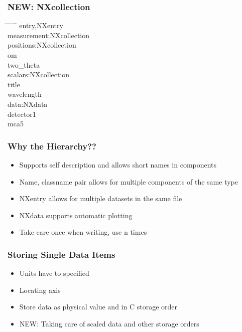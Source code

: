 \documentclass{beamer}
\begin{document}
\begin{frame} \frametitle{{\color{red}NEW: NXcollection}}
\begin{tabbing}
\hspace*{1cm} \= \hspace*{1cm} \= \hspace*{1cm} \= \hspace*{1cm} \= \hspace*{1cm} \= \hspace*{1cm}\= \kill
\>entry,NXentry\\
\> \>measurement:NXcollection\\
\> \> \>positions:NXcollection\\
\> \> \> \>om \\
\> \> \> \>two\_theta\\
\> \> \>scalars:NXcollection\\
\> \> \> \>title\\
\> \> \> \>wavelength\\
\> \> \>data:NXdata\\
\> \> \> \>detector1\\
\> \> \> \>mca5\\
\end{tabbing}
\end{frame}


\begin{frame} \frametitle{Why the Hierarchy??}
\begin{itemize}
\item<1->Supports self description and allows short names in components
\item<2->Name, classname pair allows for multiple components of the same type
\item<3->NXentry allows for multiple datasets in the same file
\item<4->NXdata supports automatic plotting
\item<5->Take care once when writing, use n times
\end{itemize}
\end{frame}


\begin{frame} \frametitle{Storing Single Data Items }
\begin{itemize}
\item Units have to specified
\item Locating axis
\item Store data as physical value and in C storage order
\item {\color{red}NEW}: Taking care of scaled data and other storage orders
\end{itemize}
\end{frame}
\end{document}
